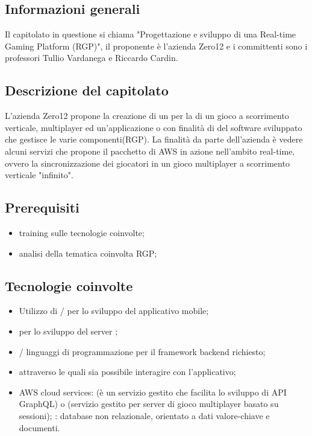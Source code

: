 \subsection{Informazioni generali}
Il capitolato in questione si chiama "Progettazione e sviluppo di una {Real-time Gaming Platform (RGP)}", il proponente è l'azienda Zero12 e i committenti sono i professori Tullio Vardanega e Riccardo Cardin.

\subsection{Descrizione del capitolato}
L’azienda Zero12 propone la creazione di un  per la  di un gioco a scorrimento verticale, multiplayer ed un'applicazione  o  con finalità di  del software sviluppato che gestisce le varie componenti(RGP).
La finalità da parte dell’azienda è vedere alcuni servizi che propone il pacchetto di AWS in azione nell’ambito real-time, ovvero la sincronizzazione dei giocatori in un gioco multiplayer a scorrimento verticale "infinito".
\subsection{Prerequisiti}
\begin{itemize}
\item training sulle tecnologie coinvolte;
\item analisi della tematica coinvolta RGP; 
\end{itemize}
\subsection{Tecnologie coinvolte}
\begin{itemize}
\item Utilizzo di / per lo sviluppo del applicativo mobile;
\item {} per lo sviluppo del server ;
\item {}/ linguaggi di programmazione per il framework backend richiesto;
\item {}  attraverso le quali sia possibile interagire con l'applicativo;
\item AWS cloud services: 
(è un servizio gestito che facilita lo sviluppo di API GraphQL) o (servizio gestito per server di gioco multiplayer basato su sessioni);
: database non relazionale, orientato a dati valore-chiave e documenti.
\end{itemize}

